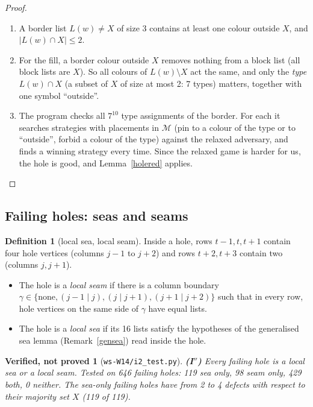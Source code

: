 \documentclass[11pt]{article}
\theoremstyle{plain}
\newtheorem{verified}[theorem]{Verified, not proved}
\theoremstyle{definition}
\newtheorem{definition}[theorem]{Definition}
\theoremstyle{remark}
\newcommand{\sm}{\setminus}
\newcommand{\script}[1]{\texttt{#1}}
\newenvironment{steps}[1][]{\begin{enumerate}[label=\textbf{Step \arabic*.},leftmargin=4.4em,itemsep=0.35em,#1]}{\end{enumerate}}
\begin{document}
\begin{proof}
\begin{steps}
\item A border list $L(w) \ne X$ of size 3 contains at least one colour outside $X$, and $|L(w) \cap X| \le 2$.
\item For the fill, a border colour outside $X$ removes nothing from a block list (all block lists are $X$). So all colours
of $L(w) \sm X$ act the same, and only the \emph{type} $L(w) \cap X$ (a subset of $X$ of size at most 2: 7 types) matters,
together with one symbol ``outside''.
\item The program checks all $7^{10}$ type assignments of the border. For each it searches strategies with placements in
$\mathcal{M}$ (pin to a colour of the type or to ``outside'', forbid a colour of the type) against the relaxed adversary,
and finds a winning strategy every time. Since the relaxed game is harder for us, the hole is good, and
Lemma~\ref{holered} applies. \qedhere
\end{steps}
\end{proof}

\subsection{Failing holes: seas and seams}

\begin{definition}[local sea, local seam]\label{localdef}
Inside a hole, rows $t-1, t, t+1$ contain four hole vertices (columns $j - 1$ to $j + 2$) and rows $t + 2, t + 3$ contain two
(columns $j, j+1$).
\begin{itemize}[nosep]
\item The hole is a \emph{local seam} if there is a column boundary $\gamma \in \{\text{none}, (j{-}1 \mid j), (j \mid j{+}1),
(j{+}1 \mid j{+}2)\}$ such that in every row, hole vertices on the same side of $\gamma$ have equal lists.
\item The hole is a \emph{local sea} if its 16 lists satisfy the hypotheses of the generalised sea lemma
(Remark~\ref{gensea}) read inside the hole.
\end{itemize}
\end{definition}

\begin{verified}[\script{ws-W14/i2\_test.py}]\label{I2}
\textbf{(I$''$)} Every failing hole is a local sea or a local seam. Tested on 646 failing holes: 119 sea only, 98 seam only,
429 both, 0 neither. The sea-only failing holes have from 2 to 4 defects with respect to their majority set $X$ (119 of 119).
\end{verified}
\end{document}
